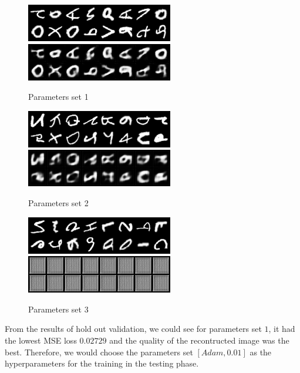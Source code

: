 \documentclass{article}
\begin{document}
\begin{figure}[h]
  \centering
  \includegraphics[scale=0.9]{val_raw_round1.png}
  \includegraphics[scale=0.9]{val_recond_round1.png}
  \caption{Parameters set 1}
\end{figure}



\begin{figure}[h]
	\centering
	\includegraphics[scale=0.9]{val_raw_round2.png}
	\includegraphics[scale=0.9]{val_recond_round2.png}
	\caption{Parameters set 2}
\end{figure}

\begin{figure}[h]
	\centering
	\includegraphics[scale=0.9]{val_raw_round3.png}
	\includegraphics[scale=0.9]{val_recond_round3.png}
	\caption{Parameters set 3}
\end{figure}

\pagebreak

From the results of hold out validation, we could see for parameters set $1$, it had the lowest MSE loss $0.02729$ and the quality of the recontructed image was the best. Therefore, we would choose the parameters set $[Adam, 0.01]$ as the hyperparameters for the training in the testing phase.
\end{document}
